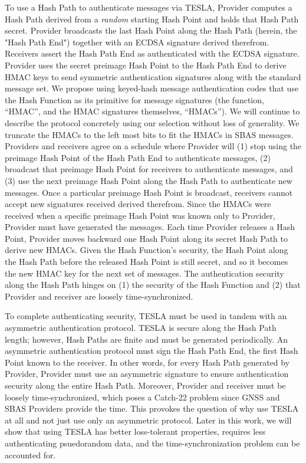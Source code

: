\documentclass[letterpaper,times]{IONconf/IONconf}
\begin{document}
		To use a Hash Path to authenticate messages via TESLA, Provider computes a Hash Path derived from a {\em random} starting Hash Point and holds that Hash Path secret.
		Provider broadcasts the last Hash Point along the Hash Path (herein, the "Hash Path End") together with an ECDSA signature derived therefrom.
		Receivers assert the Hash Path End as authenticated with the ECDSA signature.
		Provider uses the secret preimage Hash Point to the Hash Path End to derive HMAC keys to send symmetric authentication signatures along with the standard message set.
		We propose using keyed-hash message authentication codes that use the Hash Function as its primitive for message signatures (the function, ``HMAC'', and the HMAC signatures themselves, ``HMACs''). 
		We will continue to describe the protocol concretely using our selection without loss of generality.
		We truncate the HMACs to the left most bits to fit the HMACs in SBAS messages.
		Providers and receivers agree on a schedule where Provider will (1) stop using the preimage Hash Point of the Hash Path End to authenticate messages, (2) broadcast that preimage Hash Point for receivers to authenticate messages, and (3) use the next preimage Hash Point along the Hash Path to authenticate new messages.
		Once a particular preimage Hash Point is broadcast, receivers cannot accept new signatures received derived therefrom.
		Since the HMACs were received when a specific preimage Hash Point was known only to Provider, Provider must have generated the messages.
		Each time Provider releases a Hash Point, Provider moves backward one Hash Point along its secret Hash Path to derive new HMACs.
		Given the Hash Function's security, the Hash Point along the Hash Path before the released Hash Point is still secret, and so it becomes the new HMAC key for the next set of messages.
		The authentication security along the Hash Path hinges on (1) the security of the Hash Function and (2) that Provider and receiver are loosely time-synchronized.

		To complete authenticating security, TESLA must be used in tandem with an asymmetric authentication protocol.
		TESLA is secure along the Hash Path length; however, Hash Paths are finite and must be generated periodically.
		An asymmetric authentication protocol must sign the Hash Path End, the first Hash Point known to the receiver.
		In other words, for every Hash Path generated by Provider, Provider must use an asymmetric signature to ensure authentication security along the entire Hash Path.
		Moreover, Provider and receiver must be loosely time-synchronized, which poses a Catch-22 problem since GNSS and SBAS Providers provide the time.
		This provokes the question of why use TESLA at all and not just use only an asymmetric protocol.
		Later in this work, we will show that using TESLA has better loss-tolerant properties, requires less authenticating psuedorandom data, and the time-synchronization problem can be accounted for.
\end{document}

